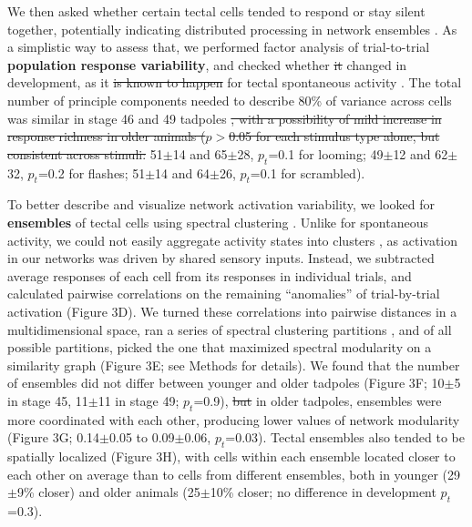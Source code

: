 \documentclass{article}
\providecommand{\DIFaddtex}[1]{{\protect\color{blue}{#1}}} %
\providecommand{\DIFdeltex}[1]{{\protect\color{red}\sout{#1}}}                      %
\providecommand{\DIFaddbegin}{} %
\providecommand{\DIFaddend}{} %
\providecommand{\DIFdelbegin}{} %
\providecommand{\DIFdelend}{} %
\providecommand{\DIFadd}[1]{\texorpdfstring{\DIFaddtex{#1}}{#1}} %
\providecommand{\DIFdel}[1]{\texorpdfstring{\DIFdeltex{#1}}{}} %
\newcommand{\DIFscaledelfig}{0.5}
\newlength{\DIFdelgraphicswidth} %
\newlength{\DIFdelgraphicsheight} %
\newcommand{\DIFaddincludegraphics}[2][]{{\color{blue}\fbox{\DIFOincludegraphics[#1]{#2}}}} %
\newcommand{\DIFdelincludegraphics}[2][]{%
\sbox{\DIFdelgraphicsbox}{\DIFOincludegraphics[#1]{#2}}%
\settoboxwidth{\DIFdelgraphicswidth}{\DIFdelgraphicsbox} %
\settoboxtotalheight{\DIFdelgraphicsheight}{\DIFdelgraphicsbox} %
\scalebox{\DIFscaledelfig}{%
\parbox[b]{\DIFdelgraphicswidth}{\usebox{\DIFdelgraphicsbox}\\[-\baselineskip] \rule{\DIFdelgraphicswidth}{0em}}\llap{\resizebox{\DIFdelgraphicswidth}{\DIFdelgraphicsheight}{%
\setlength{\unitlength}{\DIFdelgraphicswidth}%
\begin{picture}(1,1)%
\thicklines\linethickness{2pt} %
{\color[rgb]{1,0,0}\put(0,0){\framebox(1,1){}}}%
{\color[rgb]{1,0,0}\put(0,0){\line( 1,1){1}}}%
{\color[rgb]{1,0,0}\put(0,1){\line(1,-1){1}}}%
\end{picture}%
}\hspace*{3pt}}} %
} %
\DeclareRobustCommand{\DIFaddbegin}{\DIFOaddbegin \let\includegraphics\DIFaddincludegraphics} %
\DeclareRobustCommand{\DIFaddend}{\DIFOaddend \let\includegraphics\DIFOincludegraphics} %
\DeclareRobustCommand{\DIFdelbegin}{\DIFOdelbegin \let\includegraphics\DIFdelincludegraphics} %
\DeclareRobustCommand{\DIFdelend}{\DIFOaddend \let\includegraphics\DIFOincludegraphics} %
\begin{document}
We then asked whether certain tectal cells tended to respond or stay silent together, potentially indicating distributed processing in network ensembles \DIFaddbegin \DIFadd{\mbox{%
\citep{orger2016review}}\hspace{0pt}%
}\DIFaddend . As a simplistic way to assess that, we performed factor analysis of trial-to-trial \textbf{population response variability}, and checked whether \DIFdelbegin \DIFdel{it }\DIFdelend \DIFaddbegin \DIFadd{its results }\DIFaddend changed in development, as it \DIFdelbegin \DIFdel{is known to happen }\DIFdelend \DIFaddbegin \DIFadd{happens }\DIFaddend for tectal spontaneous activity \citep{xu2011}. The total number of principle components needed to describe 80\% of variance across cells \citep{avitan2017spontaneous} was similar in stage 46 and 49 tadpoles \DIFdelbegin \DIFdel{, with a possibility of mild increase in response richness in older animals ($p>$0.05 for each stimulus type alone, but consistent across stimuli: }\DIFdelend \DIFaddbegin \DIFadd{(}\DIFaddend 51$\pm$14 and 65$\pm$28, $p_t$=0.1 for looming; 49$\pm$12 and 62$\pm$32, $p_t$=0.2 for flashes; 51$\pm$14 and 64$\pm$26, $p_t$=0.1 for scrambled).

To better describe and visualize network activation variability, we looked for \textbf{ensembles} of tectal cells using spectral clustering \citep{thompson2016ensembles}. Unlike for spontaneous activity, we could not easily aggregate activity states into clusters \citep{avitan2017spontaneous}, as activation in our networks was driven by shared sensory inputs. Instead, we subtracted average responses of each cell from its responses in individual trials, and calculated pairwise correlations on the remaining “anomalies” of trial-by-trial activation (Figure 3D). We turned these correlations into pairwise distances in a multidimensional space, ran a series of spectral clustering partitions \citep{ng2002spectral}, and of all possible partitions, picked the one that maximized spectral modularity on a similarity graph \citep{newman2006modularity, gomez2009community} (Figure 3E; see Methods for details). We found that the number of ensembles did not differ between younger and older tadpoles (Figure 3F; 10$\pm$5 in stage 45, 11$\pm$11 in stage 49; $p_t$=0.9), \DIFdelbegin \DIFdel{but }\DIFdelend \DIFaddbegin \DIFadd{although }\DIFaddend in older tadpoles, ensembles were more coordinated with each other,  producing lower values of network modularity (Figure 3G; 0.14$\pm$0.05 to 0.09$\pm$0.06, $p_t$=0.03). Tectal ensembles also tended to be spatially localized (Figure 3H), with cells within each ensemble located closer to each other on average than to cells from different ensembles, both in younger (29$\pm$9\% closer) and older animals (25$\pm$10\% closer; no difference in development $p_t$=0.3).
\end{document}
